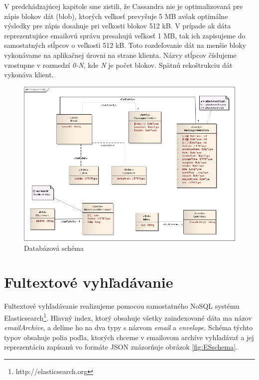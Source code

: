 \documentclass[11pt,twoside,a4paper]{book}
\begin{document}

V predchádzajúcej kapitole sme zistili, že Cassandra nie je optimalizovaná pre zápis blokov dát (blob), ktorých veľkosť prevyšuje 5 MB avšak optimálne výsledky pre zápis dosahuje pri veľkosti blokov 512 kB. V prípade ak dáta reprezentujúce emailovú správu presahujú veľkosť 1 MB, tak ich zapisujeme do samostatných stĺpcov o veľkosti 512 kB. Toto rozdeľovanie dát na menšie bloky vykonávame na aplikačnej úrovni na strane klienta. Názvy stĺpcov číslujeme vzostupne v rozmedzí \emph{0-N}, kde \emph{N} je počet blokov. Spätnú rekoštrukciu dát vykonáva klient.

\begin{figure}[h]
 \centering
 \includegraphics[width=17cm]{./figures/cassandra.png}
 \caption{Databázová schéma}
 \label{fig:Cschema}
\end{figure}

\section{Fultextové vyhľadávanie}

Fultextové vyhľadávanie realizujeme pomocou samostatného NoSQL systému Elasticsearch\footnote{http://elasticsearch.org}. Hlavný index, ktorý obsahuje všetky zaindexované dáta ma názov \emph{emailArchive}, a delíme ho na dva typy s názvom \emph{email} a \emph{envelope}. Schéma týchto typov obsahuje polia poďla, ktorých chceme v emailovom archíve vyhľadávať a jej reprezentáciu zapísanú vo formáte JSON znázorňuje obrázok \ref{fig:ESschema}.
\end{document}
